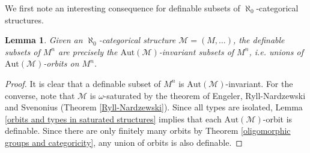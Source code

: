 \documentclass[10pt]{amsart}
\newcommand{\MM}{\mathcal{M}}
\newcommand{\Aut}{\mathrm{Aut}}
\newtheorem{lemma}[theorem]{Lemma}
\theoremstyle{definition}
\theoremstyle{remark}
\begin{document}
We first note an interesting consequence for definable subsets of $\aleph_0$-categorical structures. 

\begin{lemma} 
Given an $\aleph_0$-categorical structure $\MM=(M,\dots)$, the definable subsets of $M^n$ are precisely the $\Aut(\MM)$-invariant subsets of $M^n$, i.e. unions of $\Aut(\MM)$-orbits on $M^n$. 
\end{lemma} 
\begin{proof} 
It is clear that a definable subset of $M^n$ is $\Aut(\MM)$-invariant. For the converse, note that $\MM$ is $\omega$-saturated by the theorem of Engeler, Ryll-Nardzewski and Svenonius (Theorem \ref{Ryll-Nardzewski}). Since all types are isolated, Lemma \ref{orbits and types in saturated structures} implies that each $\Aut(\MM)$-orbit is definable. Since there are only finitely many orbits by Theorem \ref{oligomorphic groups and categoricity}, any union of orbits is also definable. 
\end{proof} 
\end{document}
